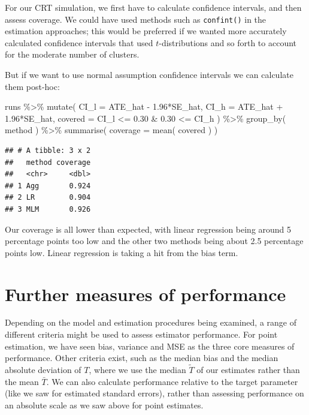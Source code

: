 \documentclass[
]{book}
\newenvironment{Shaded}{\begin{snugshade}}{\end{snugshade}}
\newcommand{\AttributeTok}[1]{\textcolor[rgb]{0.77,0.63,0.00}{#1}}
\newcommand{\FloatTok}[1]{\textcolor[rgb]{0.00,0.00,0.81}{#1}}
\newcommand{\FunctionTok}[1]{\textcolor[rgb]{0.00,0.00,0.00}{#1}}
\newcommand{\NormalTok}[1]{#1}
\newcommand{\SpecialCharTok}[1]{\textcolor[rgb]{0.00,0.00,0.00}{#1}}
\begin{document}
For our CRT simulation, we first have to calculate confidence intervals, and then assess coverage.
We could have used methods such as \texttt{confint()} in the estimation approaches; this would be preferred if we wanted more accurately calculated confidence intervals that used \(t\)-distributions and so forth to account for the moderate number of clusters.

But if we want to use normal assumption confidence intervals we can calculate them post-hoc:

\begin{Shaded}
\begin{Highlighting}[]
\NormalTok{runs }\SpecialCharTok{\%\textgreater{}\%} \FunctionTok{mutate}\NormalTok{( }\AttributeTok{CI\_l =}\NormalTok{ ATE\_hat }\SpecialCharTok{{-}} \FloatTok{1.96}\SpecialCharTok{*}\NormalTok{SE\_hat,}
                 \AttributeTok{CI\_h =}\NormalTok{ ATE\_hat }\SpecialCharTok{+} \FloatTok{1.96}\SpecialCharTok{*}\NormalTok{SE\_hat,}
                 \AttributeTok{covered =}\NormalTok{ CI\_l }\SpecialCharTok{\textless{}=} \FloatTok{0.30} \SpecialCharTok{\&} \FloatTok{0.30} \SpecialCharTok{\textless{}=}\NormalTok{ CI\_h ) }\SpecialCharTok{\%\textgreater{}\%}
  \FunctionTok{group\_by}\NormalTok{( method ) }\SpecialCharTok{\%\textgreater{}\%}
  \FunctionTok{summarise}\NormalTok{( }\AttributeTok{coverage =} \FunctionTok{mean}\NormalTok{( covered ) )}
\end{Highlighting}
\end{Shaded}

\begin{verbatim}
## # A tibble: 3 x 2
##   method coverage
##   <chr>     <dbl>
## 1 Agg       0.924
## 2 LR        0.904
## 3 MLM       0.926
\end{verbatim}

Our coverage is all lower than expected, with linear regression being around 5 percentage points too low and the other two methods being about 2.5 percentage points low.
Linear regression is taking a hit from the bias term.

\hypertarget{further-measures-of-performance}{%
\section{Further measures of performance}\label{further-measures-of-performance}}

Depending on the model and estimation procedures being examined, a range of different criteria might be used to assess estimator performance.
For point estimation, we have seen bias, variance and MSE as the three core measures of performance.
Other criteria exist, such as the median bias and the median absolute deviation of \(T\), where we use the median \(\tilde{T}\) of our estimates rather than the mean \(\bar{T}\).
We can also calculate performance relative to the target parameter (like we saw for estimated standard errors), rather than assessing performance on an absolute scale as we saw above for point estimates.
\end{document}
